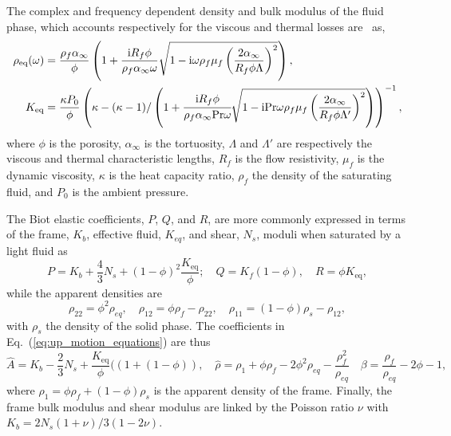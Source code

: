 The complex and frequency dependent density and bulk modulus of the fluid phase, which
accounts respectively for the viscous and thermal losses are~\cite{johnson1987,champoux1991} as,
\begin{equation}
\begin{aligned}
 \rho_{\text{eq}}(\omega) &= \frac{\rho_{f} \alpha_{\infty}}{\phi}\left(1+\frac{\mathrm i R_f \phi}{\rho_f \alpha_\infty\omega} \sqrt{1- \mathrm i  \omega  \rho_{f} \mu_f \left(\frac{ 2\alpha_{\infty}}{R_f \phi \Lambda}\right)^2 }\right),\\
K_{\text{eq}} &=\frac{\kappa P_{0}}{\phi}\left(\kappa-(\kappa-1)/\left(1+ \cfrac{\mathrm i R_f \phi}{\rho_f \alpha_\infty\text{Pr} \omega} \sqrt{1- \mathrm i\text{Pr} \omega \rho_{f} \mu_f\left( \frac{ 2\alpha_{\infty}}{R_f \phi \Lambda^{\prime}}\right)^2 }\right)\right)^{-1}, 
\end{aligned}
\end{equation}
where $\phi$ is the porosity, $\alpha_{\infty}$ is the tortuosity, $\Lambda$ and $\Lambda'$ are respectively the viscous and thermal characteristic lengths, $R_f$ is the flow resistivity, $\mu_f$ is the dynamic viscosity, $\kappa$ is the heat capacity ratio, $\rho_f$ the density of the saturating fluid, and $P_0$ is the ambient pressure.

The Biot elastic coefficients, $P$, $Q$, and $R$, are more commonly expressed in terms of the frame, $K_b$, effective fluid, $K_{eq}$, and shear, $N_s$, moduli when saturated by a light fluid as
\begin{equation}
P = K_b + \frac{4}{3} N_s + (1 - \phi)^2 \frac{K_{\text{eq}}}{\phi}; \quad Q = K_f(1- \phi), \quad R = \phi K_{\text{eq}},
\end{equation}
while the apparent densities are
\begin{equation}
\rho_{22}=\phi^{2} \rho_{eq}, \quad
\rho_{12}=\phi \rho_f-\rho_{22}, \quad
\rho_{11}=(1 - \phi) \rho_s-\rho_{12},
\end{equation}
 with $\rho_s$ the density of the solid phase.
The coefficients in Eq.~(\ref{eq:up_motion_equations}) are thus
\begin{equation}
    \hat A = K_b - \frac 2 3 N_s + \frac{K_{\text{eq}}}{\phi} ( \left( 1 + (1 - \phi) \right), \quad \hat \rho = \rho_1 + \phi \rho_f - 2 \phi^2\rho_{eq} - \frac{\rho_f^2}{\rho_{eq}}\quad
    \beta = \frac{\rho_f }{\rho_{eq}} - 2 \phi - 1, 
\end{equation}
where $\rho_1= \phi \rho_f + (1-\phi )\rho_s$ is 
the apparent density of the frame. Finally, the frame bulk modulus and shear modulus are linked by the Poisson ratio $\nu$ with $K_b=2N_s(1+\nu)/3(1-2\nu)$.

